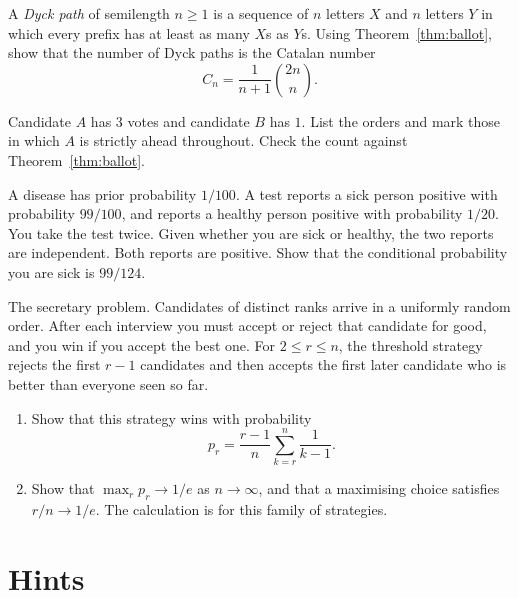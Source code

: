 \begin{exercise}[$\star\star$]\label{ex:catalan}
A \emph{Dyck path} of semilength $n\ge1$ is a sequence of $n$ letters $X$ and $n$ letters $Y$ in which every prefix has at least as many $X$s as $Y$s. Using Theorem~\ref{thm:ballot}, show that the number of Dyck paths is the Catalan number
\[
 C_n=\frac1{n+1}\binom{2n}{n}.
\]
\end{exercise}

\begin{exercise}[$\star$]\label{ex:smallballot}
Candidate $A$ has $3$ votes and candidate $B$ has $1$. List the orders and mark those in which $A$ is strictly ahead throughout. Check the count against Theorem~\ref{thm:ballot}.
\end{exercise}


\begin{exercise}[$\star$]\label{ex:twotests}
A disease has prior probability $1/100$. A test reports a sick person positive with probability $99/100$, and reports a healthy person positive with probability $1/20$. You take the test twice. Given whether you are sick or healthy, the two reports are independent. Both reports are positive. Show that the conditional probability you are sick is $99/124$.
\end{exercise}

\begin{exercise}[$\star\star$]\label{ex:secretary}
The secretary problem. Candidates of distinct ranks arrive in a uniformly random order. After each interview you must accept or reject that candidate for good, and you win if you accept the best one. For $2\le r\le n$, the threshold strategy rejects the first $r-1$ candidates and then accepts the first later candidate who is better than everyone seen so far.
\begin{enumerate}[label=(\alph*)]
\item Show that this strategy wins with probability
\[
 p_r=\frac{r-1}n\sum_{k=r}^n\frac1{k-1}.
\]
\item Show that $\max_r p_r\to 1/e$ as $n\to\infty$, and that a maximising choice satisfies $r/n\to 1/e$. The calculation is for this family of strategies.
\end{enumerate}
\end{exercise}

\section{Hints}

